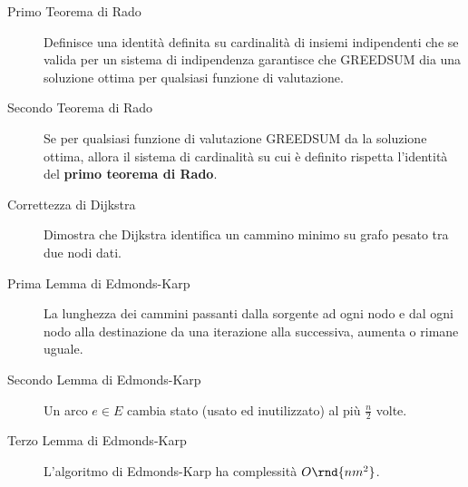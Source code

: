 \documentclass[\main/main.tex]{subfiles}
\begin{document}
\begin{multicols}{2}
\begin{description}
		\item[Primo Teorema di Rado] Definisce una identità definita su cardinalità di insiemi indipendenti che se valida per un sistema di indipendenza garantisce che GREEDSUM dia una soluzione ottima per qualsiasi funzione di valutazione.
		\item[Secondo Teorema di Rado] Se per qualsiasi funzione di valutazione GREEDSUM da la soluzione ottima, allora il sistema di cardinalità su cui è definito rispetta l'identità del \textbf{primo teorema di Rado}.
		\item[Correttezza di Dijkstra] Dimostra che Dijkstra identifica un cammino minimo su grafo pesato tra due nodi dati.
		\item[Prima Lemma di Edmonds-Karp] La lunghezza dei cammini passanti dalla sorgente ad ogni nodo e dal ogni nodo alla destinazione da una iterazione alla successiva, aumenta o rimane uguale.
		\item[Secondo Lemma di Edmonds-Karp] Un arco \(e \in E\) cambia stato (usato ed inutilizzato) al più \(\frac{n}{2}\) volte.
		\item[Terzo Lemma di Edmonds-Karp] L'algoritmo di Edmonds-Karp ha complessità \(O\rnd{nm^2}\).
	\end{description}
\end{multicols}
\end{document}
